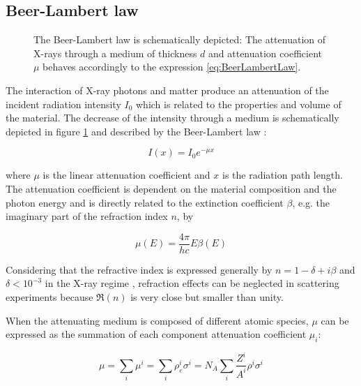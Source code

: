 \subsection{Beer-Lambert law}
\label{sec:BeerLambert}

\begin{figure}[hbt]%
	\centering
	        \def\svgwidth{0.75\linewidth}
		
		\caption[Depiction of the Beer-Lambert law]{The Beer-Lambert law is schematically depicted: The attenuation of X-rays through a medium of thickness $d$ and attenuation coefficient $\mu$ behaves accordingly to the expression \ref{eq:BeerLambertLaw}.}
		\label{fig:BeerLambertScheme}
\end{figure}

The interaction of X-ray photons and matter produce an attenuation of the incident radiation intensity $I_0$ which is related to the properties and volume of the material. The decrease of the intensity through a medium is schematically depicted in figure \ref{fig:BeerLambertScheme} and described by the Beer-Lambert law \citep{als-nielsen_elements_2011}:

\begin{equation}
        \label{eq:BeerLambertLaw}
        I\left( x \right)=I_0e^{-\mu x}
\end{equation}

where $\mu$ is the linear attenuation coefficient and $x$ is the radiation path length. The attenuation coefficient is dependent on the material composition and the photon energy and is directly related to the extinction coefficient $\beta$, e.g. the imaginary part of the refraction index $n$, by \citep{baumgartel_e.-e._1984-1}

\begin{equation}
        \mu (E) = \frac{4\pi}{hc} E \beta(E)
\end{equation}

Considering that the refractive index is expressed generally by $n = 1 - \delta +i \beta$ and $\delta<10^{-3}$ in the X-ray regime \citep{henke_x-ray_1993}, refraction effects can be neglected in scattering experiments because $\Re(n)$ is very close but smaller than unity.

When the attenuating medium is composed of different atomic species, $\mu$ can be expressed as the summation of each component attenuation coefficient $\mu_i$:

\begin{equation}
        \label{eq:AttenuationMultiComponent}
        \mu = \sum_i \mu^i = \sum_i \rho_e^i \sigma^i  =N_A\sum_i  \frac{Z^i}{A^i} \rho^i \sigma^i
\end{equation}

